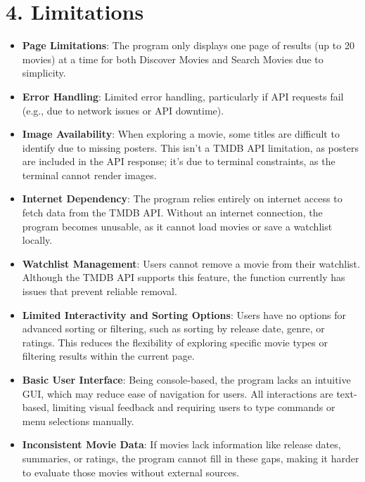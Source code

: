 \documentclass[11pt]{article}
\begin{document}
\section*{4. Limitations}
\begin{itemize}
  \item \textbf{Page Limitations}: The program only displays one page of results (up to 20 movies) at a time for both Discover Movies and Search Movies due to simplicity.
  \item \textbf{Error Handling}: Limited error handling, particularly if API requests fail (e.g., due to network issues or API downtime).
  \item \textbf{Image Availability}: When exploring a movie, some titles are difficult to identify due to missing posters. This isn’t a TMDB API limitation, as posters are included in the API response; it’s due to terminal constraints, as the terminal cannot render images.
  \item \textbf{Internet Dependency}: The program relies entirely on internet access to fetch data from the TMDB API. Without an internet connection, the program becomes unusable, as it cannot load movies or save a watchlist locally.
  \item \textbf{Watchlist Management}: Users cannot remove a movie from their watchlist. Although the TMDB API supports this feature, the function currently has issues that prevent reliable removal.
  \item \textbf{Limited Interactivity and Sorting Options}: Users have no options for advanced sorting or filtering, such as sorting by release date, genre, or ratings. This reduces the flexibility of exploring specific movie types or filtering results within the current page.
  \item \textbf{Basic User Interface}: Being console-based, the program lacks an intuitive GUI, which may reduce ease of navigation for users. All interactions are text-based, limiting visual feedback and requiring users to type commands or menu selections manually.
  \item \textbf{Inconsistent Movie Data}: If movies lack information like release dates, summaries, or ratings, the program cannot fill in these gaps, making it harder to evaluate those movies without external sources.
\end{itemize}
\end{document}

